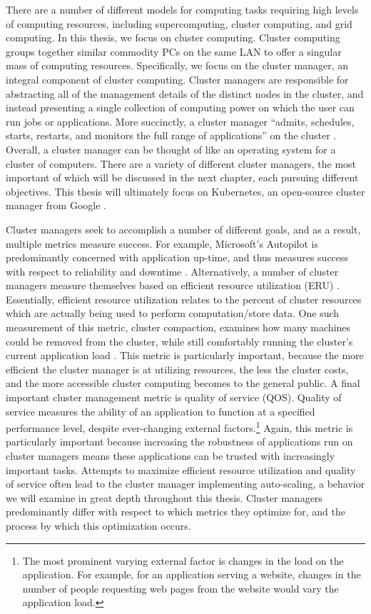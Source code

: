 There are a number of different models for computing tasks requiring high levels
of computing resources, including supercomputing, cluster computing, and grid
computing. In this thesis, we focus on cluster computing. Cluster computing
groups together similar commodity PCs on the same LAN to offer a singular mass
of computing resources. Specifically, we focus on the
cluster manager, an integral component of cluster computing. Cluster managers
are responsible for abstracting all of the management details of the distinct
nodes in the cluster, and instead presenting a single collection of computing
power on which the user can run jobs or applications. More succinctly,
a cluster manager ``admits, schedules, starts, restarts, and monitors the full
range of applications'' on the cluster \cite{borg}. Overall, a cluster
manager can be thought of like an operating system for a cluster of computers. There are a
variety of different cluster managers, the most important of which will be
discussed in the next chapter, each pursuing different objectives. This
thesis will ultimately focus on Kubernetes, an open-source cluster
manager from Google \cite{k8s-website}.

Cluster managers seek to accomplish a number of different goals, and as a
result, multiple metrics measure success. For example, Microsoft's Autopilot is
predominantly concerned with application up-time, and thus measures success
with respect to reliability and downtime \cite{autopilot}.
Alternatively, a number of cluster managers measure themselves based on
efficient resource utilization (ERU) \cite{borg}. Essentially, efficient
resource utilization relates to the percent of cluster resources which are
actually being used to perform computation/store data.
One such measurement of this metric, cluster
compaction, examines how many machines could be removed from the cluster, while
still comfortably running the cluster's current application load
\cite{evaluating-job-packing-in-warehouse-scale-computing}. This metric is
particularly important, because the more efficient the cluster manager is at
utilizing resources, the less the cluster costs, and the more accessible cluster
computing becomes to the general public. A final important
cluster management metric is quality of service (QOS). Quality of service measures the
ability of an application to function at a specified
performance level, despite ever-changing
external factors.\footnote{The most prominent varying external factor is changes
in the load on the application. For example, for an application serving a
website, changes in the number of people requesting web pages from the website
would vary the application load.} Again, this metric is particularly important because
increasing the robustness of applications run on cluster managers means
these applications can be trusted with increasingly important tasks. Attempts to
maximize efficient resource utilization and quality of service
often lead to the cluster manager implementing
auto-scaling, a behavior we will examine in great depth throughout this thesis. Cluster
managers predominantly differ with respect to which metrics they optimize
for, and the process by which this optimization occurs.

